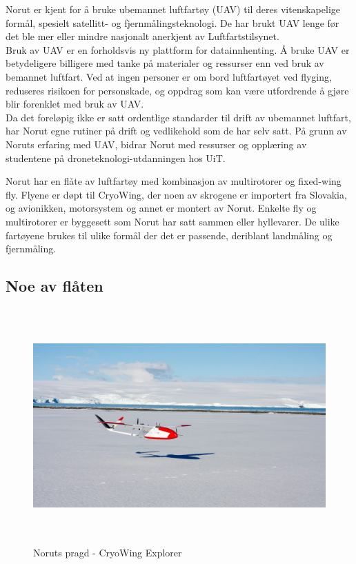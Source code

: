 \documentclass[12pt, a4paper]{article}
\begin{document}
Norut er kjent for å bruke ubemannet luftfartøy (UAV) til deres vitenskapelige formål, spesielt satellitt- og fjernmålingsteknologi.  De har brukt UAV lenge før det ble mer eller mindre nasjonalt anerkjent av Luftfartstilsynet.\\

Bruk av UAV er en forholdsvis ny plattform for datainnhenting. Å bruke UAV er betydeligere billigere med tanke på materialer og ressurser enn ved bruk av bemannet luftfart. Ved at ingen personer er om bord luftfartøyet ved flyging, reduseres risikoen for personskade, og oppdrag som kan være utfordrende å gjøre blir forenklet med bruk av UAV. \\

Da det foreløpig ikke er satt ordentlige standarder til drift av ubemannet luftfart, har Norut egne rutiner på drift og vedlikehold som de har selv satt. På grunn av Noruts erfaring med UAV, bidrar Norut med ressurser og opplæring av studentene på droneteknologi-utdanningen hos UiT. 

Norut har en flåte av luftfartøy med kombinasjon av multirotorer og fixed-wing fly. Flyene er døpt til CryoWing, der noen av skrogene er importert fra Slovakia, og avionikken, motorsystem og annet er montert av Norut. Enkelte fly og multirotorer er byggesett som Norut har satt sammen eller hyllevarer. De ulike fartøyene brukes til ulike formål der det er passende, deriblant landmåling og fjernmåling.\\
\newpage

\subsection{Noe av flåten}
\begin{figure}[hpbt]
	\centering
	\includegraphics[width=.6\textwidth, height=9cm]{bilder/CryoWing_Explorer.jpeg}
	\caption[CryoWing Explorer]{Noruts pragd - CryoWing Explorer}
\end{figure}
\end{document}
